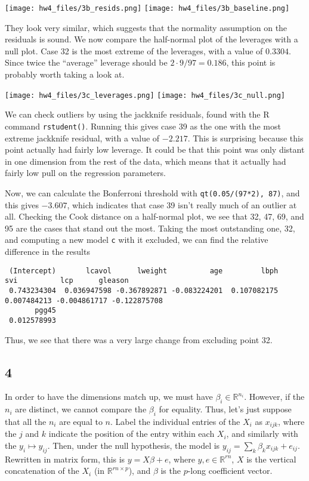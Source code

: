 \documentclass{article}
\newcommand{\rn}{\mathbb{R}}
\begin{document}
\noindent\texttt{[image: hw4\_files/3b\_resids.png]}
\texttt{[image: hw4\_files/3b\_baseline.png]}

They look very similar, which suggests that the normality assumption on the residuals is sound.
We now compare the half-normal plot of the leverages with a null plot. Case 32 is the most extreme of the leverages, with a value of $0.3304$. Since twice the ``average'' leverage should be $2\cdot9/97=0.186$, this point is probably worth taking a look at.

\noindent\texttt{[image: hw4\_files/3c\_leverages.png]}
\texttt{[image: hw4\_files/3c\_null.png]}

We can check outliers by using the jackknife residuals, found with the R command \verb|rstudent()|. Running this gives case 39 as the one with the most extreme jackknife residual, with a value of $-2.217$. This is surprising because this point actually had fairly low leverage. It could be that this point was only distant in one dimension from the rest of the data, which means that it actually had fairly low pull on the regression parameters. 

Now, we can calculate the Bonferroni threshold with \verb|qt(0.05/(97*2), 87)|, and this gives $-3.607$, which indicates that case 39 isn't really much of an outlier at all.
Checking the Cook distance on a half-normal plot, we see that 32, 47, 69, and 95 are the cases that stand out the most. Taking the most outstanding one, 32, and computing a new model \verb|c| with it excluded, we can find the relative difference in the results
\begin{verbatim}
 (Intercept)       lcavol      lweight          age         lbph          svi          lcp      gleason 
 0.743234304  0.036947598 -0.367892871 -0.083224201  0.107082175  0.007484213 -0.004861717 -0.122875708 
       pgg45 
 0.012578993
\end{verbatim}
Thus, we see that there was a very large change from excluding point 32.
\subsection*{4}
In order to have the dimensions match up, we must have $\beta_i\in\rn^{n_i}$. However, if the $n_i$ are distinct, we cannot compare the $\beta_i$ for equality. Thus, let's just suppose that all the $n_i$ are equal to $n$. Label the individual entries of the $X_i$ as $x_{ijk}$, where the $j$ and $k$ indicate the position of the entry within each $X_i$, and similarly with the $y_i\mapsto y_{ij}$. Then, under the null hypothesis, the model is $y_{ij}=\sum_k\beta_{k}x_{ijk}+e_{ij}$. Rewritten in matrix form, this is $y=X\beta+e$, where $y,e\in\rn^{rn}$, $X$ is the vertical concatenation of the $X_i$ (in $\rn^{rn\times p}$), and $\beta$ is the $p$-long coefficient vector. 
\end{document}
